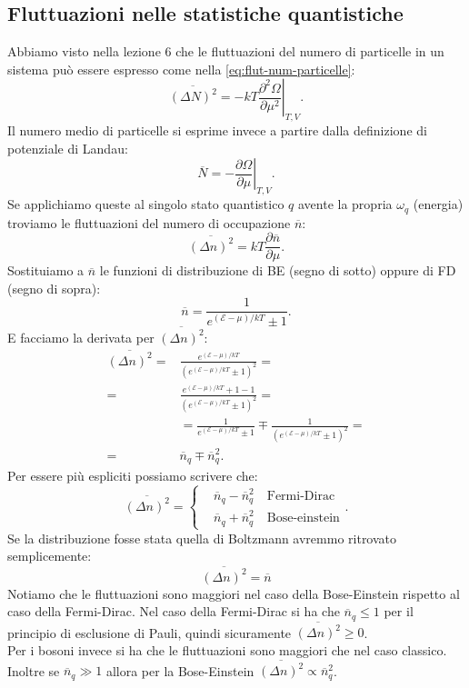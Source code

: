 \subsection{Fluttuazioni nelle statistiche quantistiche}
\label{subsec:Fluttuazioni nelle statistiche quantistiche}
Abbiamo visto nella lezione 6 che le fluttuazioni del numero di particelle in un sistema può essere espresso come nella \ref{eq:flut-num-particelle}:
\[
	\overline{\left( \Delta N \right)^2} 
	=
	-kT
	\left.\frac{\partial ^2 \Omega }{\partial \mu ^2} \right|_{T,V}
.\] 
Il numero medio di particelle si esprime invece a partire dalla definizione di potenziale di Landau:
\[
	\overline{N}
	=
	- \left.\frac{\partial \Omega }{\partial \mu } \right|_{T,V}
.\] 
Se applichiamo queste al singolo stato quantistico $q$ avente la propria $\omega_q$ (energia) troviamo le fluttuazioni del numero di occupazione $\overline{n}$:
\[
	\overline{\left( \Delta n \right)^2}
	=
	kT \frac{\partial \overline{n}}{\partial \mu } 
.\] 
Sostituiamo a $\overline{n}$ le funzioni di distribuzione di BE (segno di sotto) oppure di FD (segno di sopra): 
\[
	\overline{n} 
	= 
	\frac{1}{e^{\left( \mathcal{E} - \mu  \right) /kT} \pm 1}
.\] 
E facciamo la derivata per $\overline{\left( \Delta n \right)^2}$:
\[\begin{aligned}
	\overline{\left( \Delta n \right) ^2}
	=&
	\frac{e^{\left( \mathcal{E} -\mu  \right) /kT}}
	{\left( e^{\left( \mathcal{E} -\mu  \right) /kT} \pm 1 \right)^2}=\\
	=&
	\frac{e^{\left( \mathcal{E} -\mu  \right) /kT} +1 - 1}
	{\left( e^{\left( \mathcal{E} -\mu  \right) /kT} \pm 1 \right)^2}=\\
	&=  
	\frac{1}{e^{\left( \mathcal{E} -\mu  \right) /kT} \pm 1 } \mp 
	\frac{1}{\left( e^{\left( \mathcal{E} -\mu  \right) /kT} \pm 1  \right)^2}=\\
	=& 
	\overline{n}_q \mp \overline{n}_q^2
.\end{aligned}\]
Per essere più espliciti possiamo scrivere che:
\[
	\overline{\left( \Delta n \right)^2} 
	=
	\begin{cases}
		&\overline{n}_q - \overline{n}_q^2 \quad \text{Fermi-Dirac} \\
		&\overline{n}_q + \overline{n}_q^2 \quad \text{Bose-einstein}
	\end{cases}
.\] 
Se la distribuzione fosse stata quella di Boltzmann avremmo ritrovato semplicemente:
\[
	\overline{\left( \Delta n\right)^2} = \overline{n}
\] 
Notiamo che le fluttuazioni sono maggiori nel caso della Bose-Einstein rispetto al caso della Fermi-Dirac. 
Nel caso della Fermi-Dirac si ha che $\overline{n}_q \le 1$ per il principio di esclusione di Pauli, quindi sicuramente $\overline{\left( \Delta n \right)^2} \ge 0$. \\
Per i bosoni invece si ha che le fluttuazioni sono maggiori che nel caso classico. 
Inoltre se $\overline{n}_q \gg 1$ allora per la Bose-Einstein $\overline{\left( \Delta n \right)^2} \propto \overline{n}_q^2$.
